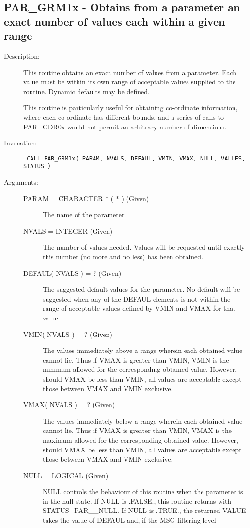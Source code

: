 \documentclass[twoside,11pt]{article}
\newcommand{\xref}[3]{#1}
\newcommand{\xlabel}[1]{}
\newlength{\sstbannerlength}
\newlength{\sstcaptionlength}
\newlength{\sstexampleslength}
\newlength{\sstexampleswidth}
\newcommand{\sstroutine}[3]{
   \goodbreak
   \rule{\textwidth}{0.5mm}
   \vspace{-7ex}
   \newline
   \settowidth{\sstbannerlength}{{\Large {\bf #1}}}
   \setlength{\sstcaptionlength}{\textwidth}
   \setlength{\sstexampleslength}{\textwidth}
   \addtolength{\sstbannerlength}{0.5em}
   \addtolength{\sstcaptionlength}{-2.0\sstbannerlength}
   \addtolength{\sstcaptionlength}{-5.0pt}
   \settowidth{\sstexampleswidth}{{\bf Examples:}}
   \addtolength{\sstexampleslength}{-\sstexampleswidth}
   \parbox[t]{\sstbannerlength}{\flushleft{\Large {\bf #1}}}
   \parbox[t]{\sstcaptionlength}{\center{\Large #2}}
   \parbox[t]{\sstbannerlength}{\flushright{\Large {\bf #1}}}
   \begin{description}
      #3
   \end{description}
}
\newcommand{\sstdescription}[1]{\item[Description:] #1}
\newcommand{\sstinvocation}[1]{\item[Invocation:]\hspace{0.4em}{\tt #1}}
\newcommand{\sstarguments}[1]{
   \item[Arguments:] \mbox{} \\
   \vspace{-3.5ex}
   \begin{description}
      #1
   \end{description}
}
\newcommand{\sstsubsection}[1]{ \item[{#1}] \mbox{} \\}
\newcommand{\ssttt}{\tt}
\renewcommand{\sstroutine}[3]{
      \subsection{\xlabel{12}#1\xlabel{#1}-\label{#1}#2}
      \begin{description}
         #3
      \end{description}
   }
\renewcommand{\sstdescription}[1]{\item[Description:]
      \begin{description}
         #1
      \end{description}
   }
\renewcommand{\sstinvocation}[1]{\item[Invocation:]
      \begin{description}
         {\ssttt #1}
      \end{description}
   }
\renewcommand{\sstarguments}[1]{
      \item[Arguments:]
      \begin{description}
         #1
      \end{description}
   }
\renewcommand{\sstsubsection}[1]{\item[{#1}]}
\begin{document}
\sstroutine{
   PAR\_GRM1x
}{
   Obtains from a parameter an exact number of values each within a
   given range
}{
   \sstdescription{
      This routine obtains an exact number of values from a parameter.
      Each value must be within its own range of acceptable values
      supplied to the routine.  Dynamic defaults may be defined.

      This routine is particularly useful for obtaining co-ordinate
      information, where each co-ordinate has different bounds, and
      a series of calls to PAR\_GDR0x would not permit an arbitrary
      number of dimensions.
   }
   \sstinvocation{
      CALL PAR\_GRM1x( PARAM, NVALS, DEFAUL, VMIN, VMAX, NULL, VALUES,
                      STATUS )
   }
   \sstarguments{
      \sstsubsection{
         PARAM = CHARACTER $*$ ( $*$ ) (Given)
      }{
         The name of the parameter.
      }
      \sstsubsection{
         NVALS = INTEGER (Given)
      }{
         The number of values needed.  Values will be requested until
         exactly this number (no more and no less) has been obtained.
      }
      \sstsubsection{
         DEFAUL( NVALS ) = ? (Given)
      }{
         The suggested-default values for the parameter.  No default
         will be suggested when any of the DEFAUL elements is not
         within the range of acceptable values defined by VMIN and
         VMAX for that value.
      }
      \sstsubsection{
         VMIN( NVALS ) = ? (Given)
      }{
         The values immediately above a range wherein each obtained
         value cannot lie.  Thus if VMAX is greater than VMIN, VMIN
         is the minimum allowed for the corresponding obtained value.
         However, should VMAX be less than VMIN, all values are
         acceptable except those between VMAX and VMIN exclusive.
      }
      \sstsubsection{
         VMAX( NVALS ) = ? (Given)
      }{
         The values immediately below a range wherein each obtained
         value cannot lie.  Thus if VMAX is greater than VMIN, VMAX
         is the maximum allowed for the corresponding obtained value.
         However, should VMAX be less than VMIN, all values are
         acceptable except those between VMAX and VMIN exclusive.
      }
      \sstsubsection{
         NULL = LOGICAL (Given)
      }{
         NULL controls the behaviour of this routine when the parameter
         is in the null state.  If NULL is .FALSE., this routine
         returns with STATUS=PAR\_\_NULL.  If NULL is .TRUE., the
         returned VALUE takes the value of DEFAUL and, if the
\xref{MSG filtering level}{sun104}{conditional_message_reporting}
}}}
\end{document}
